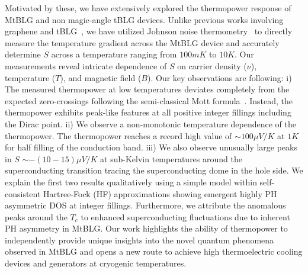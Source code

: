 \documentclass{nature}
\begin{document}
Motivated by these, we have extensively explored the thermopower response of MtBLG and non magic-angle tBLG devices. Unlike previous works involving graphene and tBLG~\cite{zuev2009thermoelectric,PhysRevB.80.081413,nam2010thermoelectric,wang2011enhanced,duan2016high,ghahari2016enhanced,mahapatra2020misorientation,ghawri2020excess}, we have utilized Johnson noise thermometry~\cite{Srivastaveaaw5798,fong2012ultrasensitive,crossno2016observation,betz2013supercollision} to directly measure the temperature gradient across the MtBLG device and accurately determine $S$ across a temperature ranging from $100mK$ to $10K$. Our measurements reveal intricate dependence of $S$ on carrier density ($\nu$), temperature ($T$), and magnetic field ($B$). Our key observations are following: i) The measured thermopower at low temperatures deviates completely from the expected zero-crossings following the semi-classical Mott formula~\cite{PhysRev.181.1336}. Instead, the thermopower exhibits peak-like features at all positive integer fillings including the Dirac point. ii) We observe a non-monotonic temperature dependence of the thermopower. The thermopower reaches a record high value of $\sim 100\mu V/K$ at $1K$ for half filling of the conduction band. iii) We also observe unusually large peaks in $S$ $\sim - (10-15)\mu V/K$ at sub-Kelvin temperatures around the superconducting transition tracing the superconducting dome in the hole side. We explain the first two results qualitatively using a simple model within self-consistent Hartree-Fock (HF) approximations showing emergent highly PH asymmetric DOS %
at integer fillings. Furthermore, we attribute the anomalous peaks around the $T_c$ to enhanced superconducting fluctuations due to inherent PH asymmetry in MtBLG. Our work highlights the ability of thermopower to independently provide unique insights into the novel quantum phenomena observed in MtBLG and opens a new route to achieve high thermoelectric cooling devices and generators at cryogenic temperatures.
\end{document}
